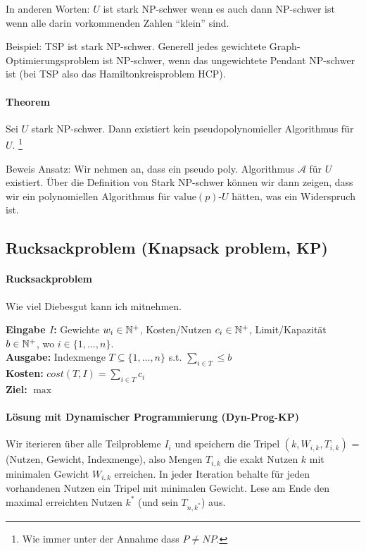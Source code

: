 In anderen Worten: $U$ ist stark NP-schwer wenn es auch dann NP-schwer ist wenn 
alle darin vorkommenden Zahlen ``klein'' sind.

Beispiel: TSP ist stark NP-schwer. Generell jedes gewichtete 
Graph-Optimierungsproblem ist NP-schwer, wenn das ungewichtete Pendant 
NP-schwer ist (bei TSP also das Hamiltonkreisproblem HCP).

\paragraph{Theorem}
Sei $U$ stark NP-schwer. Dann existiert kein pseudopolynomieller Algorithmus für $U$. 
\footnote{Wie immer unter der Annahme dass $P \neq NP$.}

Beweis Ansatz: Wir nehmen an, dass ein pseudo poly. Algorithmus $\mathcal{A}$ 
für $U$ existiert. Über die Definition von Stark NP-schwer können wir dann 
zeigen, dass wir ein polynomiellen Algorithmus für $\text{value}(p)\text{-}U$ 
hätten, was ein Widerspruch ist.


\subsection{Rucksackproblem (Knapsack problem, KP)}\label{algo-kp}

\paragraph{Rucksackproblem}
Wie viel Diebesgut kann ich mitnehmen.

\textbf{Eingabe $I$:} Gewichte $w_i \in \mathbb{N}^+$, Kosten/Nutzen $c_i \in \mathbb{N}^+$, 
Limit/Kapazität $b \in \mathbb{N}^+$, wo $i \in \{ 1, \dots, n \} $. \\
\textbf{Ausgabe:} Indexmenge $T \subseteq \{ 1, \dots, n \}$ s.t. $\sum_{i \in T } \leq b$ \\
\textbf{Kosten:} $cost(T, I) = \sum_{i \in T} c_i$ \\
\textbf{Ziel:} $\max$

\paragraph{Lösung mit Dynamischer Programmierung (Dyn-Prog-KP)} 
Wir iterieren über alle Teilprobleme $I_i$ und speichern die Tripel
$(k, W_{i, k}, T_{i, k})$ = (Nutzen, Gewicht, Indexmenge), also Mengen $T_{i, k}$
die exakt Nutzen $k$ mit minimalen Gewicht $W_{i, k}$ erreichen.
In jeder Iteration behalte für jeden vorhandenen Nutzen ein Tripel mit minimalen Gewicht.
Lese am Ende den maximal erreichten Nutzen $k^*$ (und sein $T_{n, k^*}$) aus.

